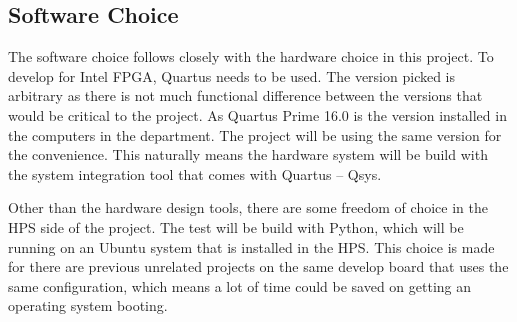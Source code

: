 \subsection{Software Choice}
The software choice follows closely with the hardware choice in this project.
To develop for Intel FPGA, Quartus needs to be used.
The version picked is arbitrary as there is not much functional difference
between the versions that would be critical to the project.
As Quartus Prime 16.0 is the version installed in the computers in the
department.
The project will be using the same version for the convenience.
This naturally means the hardware system will be build with the system
integration tool that comes with Quartus -- Qsys.

Other than the hardware design tools, there are some freedom of choice in the
HPS side of the project.
The test will be build with Python, which will be running on an Ubuntu system
that is installed in the HPS.
This choice is made for there are previous unrelated projects on the same
develop board that uses the same configuration, which means a lot of time
could be saved on getting an operating system booting.